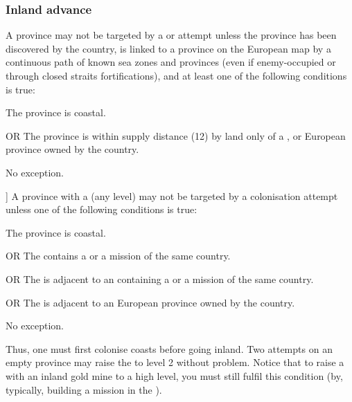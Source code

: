 \subsubsection{Inland advance}\label{chExpenses:Inland advance}
\aparag[Settlements] A province may not be targeted by a \COL or \TP attempt
unless the province has been discovered by the country, is linked to a
province on the European map by a continuous path of known sea zones and
provinces (even if enemy-occupied or through closed straits fortifications),
and at least one of the following conditions is true:
\begin{modlist}
\item The province is coastal.
\item[OR] The province is within supply distance (12\MP) by land only of a
  \COL, \TP or European province owned by the country.
\end{modlist}
\bparag No exception.

\aparag[Inland advance [TBD]] A province with a \COL (any level) may not be
targeted by a colonisation attempt unless one of the following conditions is
true:
\begin{modlist}
\item The province is coastal.
\item[OR] The \Area contains a \COL\faceplus or a mission of the same country.
\item[OR] The \Area is adjacent to an \Area containing a \COL\faceplus or a
  mission of the same country.
\item[OR] The \Area is adjacent to an European province owned by the country.
\end{modlist}
\bparag No exception.

\begin{designnote}
  Thus, one must first colonise coasts before going inland. Two attempts on an
  empty province may raise the \COL to level 2 without problem. Notice that to
  raise a \COL with an inland gold mine to a high level, you must still fulfil
  this condition (by, typically, building a mission in the \Area).
\end{designnote}


